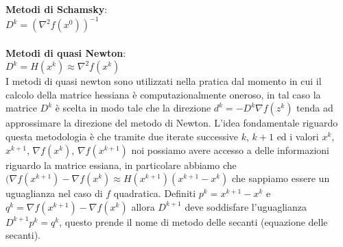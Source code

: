 \documentclass[a4paper, 12pt]{article}
\begin{document}
\textbf{Metodi di Schamsky}:\\
$D^k = (\nabla^2 f(x^0))^{-1}$\\\\
\textbf{Metodi di quasi Newton}:\\
$D^k = H(x^k) \approx \nabla^2 f(x^k)$\\
I metodi di quasi newton sono utilizzati nella pratica dal momento in cui il calcolo della matrice hessiana è computazionalmente oneroso, in tal caso la matrice $D^k$ è scelta in modo tale che la direzione $d^k = -D^k\nabla f(z^k)$ tenda ad approssimare la direzione del metodo di Newton. L'idea fondamentale riguardo questa metodologia è che tramite due iterate successive $k$, $k+1$ ed i valori $x^k$, $x^{k+1}$, $\nabla f(x^k)$, $\nabla f(x^{k+1})$ noi possiamo avere accesso a delle informazioni riguardo la matrice essiana, in particolare abbiamo che\\
$(\nabla f(x^{k+1}) - \nabla f(x^k) \approx H(x^{k+1})(x^{k+1} - x^k)$ che sappiamo essere un uguaglianza nel caso di $f$ quadratica. Definiti $p^k = x^{k+1} - x^k$ e $q^k = \nabla f(x^{k+1}) - \nabla f(x^k)$ allora $D^{k+1}$ deve soddisfare l'uguaglianza $D^{k+1} p^k = q^k$, questo prende il nome di metodo delle secanti (equazione delle secanti).
\end{document}
